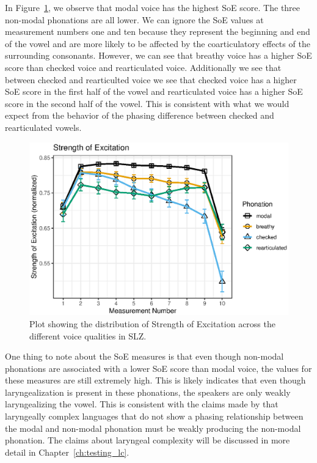 In Figure~\ref{fig:soe}, we observe that modal voice has the highest SoE score. The three non-modal phonations are all lower. We can ignore the SoE values at measurement numbers one and ten because they represent the beginning and end of the vowel and are more likely to be affected by the coarticulatory effects of the surrounding consonants. However, we can see that breathy voice has a higher SoE score than checked voice and rearticulated voice. Additionally we see that between checked and rearticulted voice we see that checked voice has a higher SoE score in the first half of the vowel and rearticulated voice has a higher SoE score in the second half of the vowel. This is consistent with what we would expect from the behavior of the phasing difference between checked and rearticulated vowels. 

\begin{figure}[h!]
    \centering
    \includegraphics{images/slz_soe.eps}
    \caption{Plot showing the distribution of Strength of Excitation across the different voice qualities in SLZ.}
    \label{fig:soe}
\end{figure}

One thing to note about the SoE measures is that even though non-modal phonations are associated with a lower SoE score than modal voice, the values for these measures are still extremely high. This is likely indicates that even though laryngealization is present in these phonations, the speakers are only weakly laryngealizing the vowel. This is consistent with the claims made by \citet{silvermanLaryngealComplexityOtomanguean1997,silvermanPhasingRecoverability1997} that laryngeally complex languages that do not show a phasing relationship between the modal and non-modal phonation must be weakly producing the non-modal phonation. The claims about laryngeal complexity will be discussed in more detail in Chapter~\ref{ch:testing_lc}.

